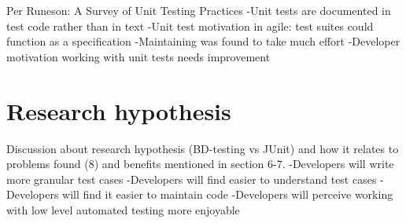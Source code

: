    Per Runeson: A Survey of Unit Testing Practices\newline
   -Unit tests are documented in test code rather than in text\newline
   -Unit test motivation in agile: test suites could function as a specification\newline
   -Maintaining was found to take much effort\newline
   -Developer motivation working with unit tests needs improvement\newline
\section{Research hypothesis}
    Discussion about research hypothesis (BD-testing vs JUnit) and how it relates to problems found (8) and benefits mentioned in section 6-7.\newline
    -Developers will write more granular test cases\newline
    -Developers will find easier to understand test cases\newline
    -Developers will find it easier to maintain code\newline
    -Developers will perceive working with low level automated testing more enjoyable\newline
